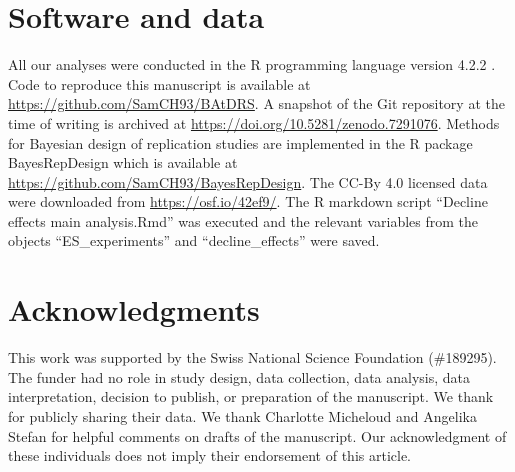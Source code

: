 \section*{Software and data}
All our analyses were conducted in the R programming language version 4.2.2
\citep{R}. Code to reproduce this manuscript is available at
\url{https://github.com/SamCH93/BAtDRS}. A snapshot of the Git repository at the
time of writing is archived at \url{https://doi.org/10.5281/zenodo.7291076}.
Methods for Bayesian design of replication studies are implemented in the R
package BayesRepDesign which is available at
\url{https://github.com/SamCH93/BayesRepDesign}. The CC-By 4.0 licensed data
were downloaded from \url{https://osf.io/42ef9/}. The R markdown script
``Decline effects main analysis.Rmd'' was executed and the relevant variables
from the objects ``ES\_experiments'' and ``decline\_effects'' were saved.

\section*{Acknowledgments}
This work was supported by the Swiss National Science Foundation (\#189295). The
funder had no role in study design, data collection, data analysis, data
interpretation, decision to publish, or preparation of the manuscript. We thank
\citet{Protzko2020} for publicly sharing their data. We thank Charlotte
Micheloud and Angelika Stefan for helpful comments on drafts of the manuscript.
Our acknowledgment of these individuals does not imply their endorsement of this
article.

